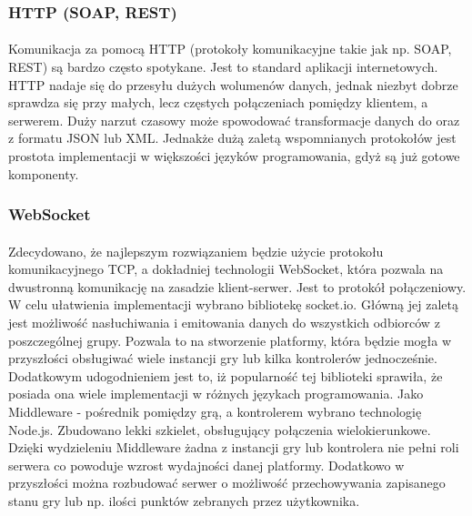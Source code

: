 \subsubsection{HTTP (SOAP, REST)}
\paragraph{}
Komunikacja za pomocą HTTP (protokoły komunikacyjne takie jak np. SOAP, REST) są bardzo często spotykane. Jest to standard aplikacji internetowych. HTTP nadaje się do przesyłu dużych wolumenów danych, jednak niezbyt dobrze sprawdza się przy małych, lecz częstych połączeniach pomiędzy klientem, a serwerem. Duży narzut czasowy może spowodować transformacje danych do oraz z formatu JSON lub XML. Jednakże dużą zaletą wspomnianych protokołów jest prostota implementacji w większości języków programowania, gdyż są już gotowe komponenty.
\subsubsection{WebSocket}
\paragraph{}
Zdecydowano, że najlepszym rozwiązaniem będzie użycie protokołu komunikacyjnego TCP, a dokładniej technologii WebSocket, która pozwala na dwustronną komunikację na zasadzie klient-serwer. Jest to protokół połączeniowy.
W celu ułatwienia implementacji wybrano bibliotekę socket.io\cite{socket}. Główną jej zaletą jest możliwość nasłuchiwania i emitowania danych do wszystkich odbiorców z poszczególnej grupy. Pozwala to na stworzenie platformy, która będzie mogła w przyszłości obsługiwać wiele instancji gry lub kilka kontrolerów jednocześnie. Dodatkowym udogodnieniem jest to, iż popularność tej biblioteki sprawiła, że posiada ona wiele implementacji w różnych językach programowania.
Jako Middleware - pośrednik pomiędzy grą, a kontrolerem wybrano technologię Node.js. Zbudowano lekki szkielet, obsługujący połączenia wielokierunkowe. Dzięki wydzieleniu Middleware żadna z instancji gry lub kontrolera nie pełni roli serwera co powoduje wzrost wydajności danej platformy. Dodatkowo w przyszłości można rozbudować serwer o możliwość przechowywania zapisanego stanu gry lub np. ilości punktów zebranych przez użytkownika.
